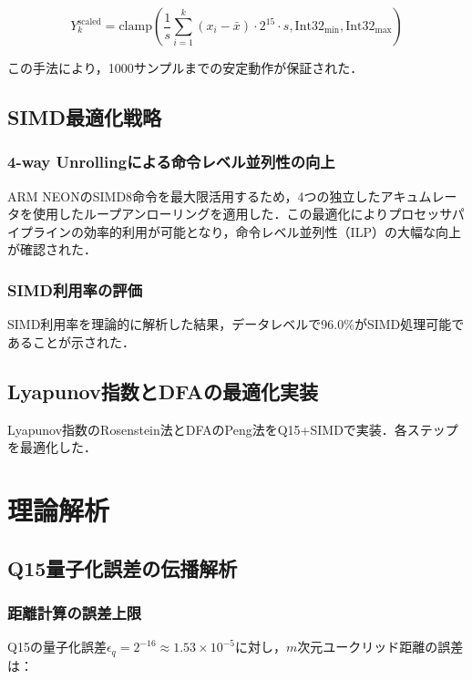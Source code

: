 \documentclass[paper]{ieice}
\begin{document}
\begin{equation}
Y_k^{\text{scaled}} = \text{clamp}\left(\frac{1}{s} \sum_{i=1}^{k} (x_i - \bar{x}) \cdot 2^{15} \cdot s, \text{Int32}_{\min}, \text{Int32}_{\max}\right)
\end{equation}

この手法により，1000サンプルまでの安定動作が保証された．

\subsection{SIMD最適化戦略}

\subsubsection{4-way Unrollingによる命令レベル並列性の向上}
ARM NEONのSIMD8命令を最大限活用するため，4つの独立したアキュムレータを使用したループアンローリングを適用した．この最適化によりプロセッサパイプラインの効率的利用が可能となり，命令レベル並列性（ILP）の大幅な向上が確認された．

\subsubsection{SIMD利用率の評価}
SIMD利用率を理論的に解析した結果，データレベルで96.0\%がSIMD処理可能であることが示された．

\subsection{Lyapunov指数とDFAの最適化実装}

Lyapunov指数のRosenstein法\cite{rosenstein1993}とDFAのPeng法\cite{peng1994}をQ15+SIMDで実装．各ステップを最適化した．

\section{理論解析}

\subsection{Q15量子化誤差の伝播解析}

\subsubsection{距離計算の誤差上限}
Q15の量子化誤差$\epsilon_q = 2^{-16} \approx 1.53 \times 10^{-5}$に対し，$m$次元ユークリッド距離の誤差は：
\end{document}
